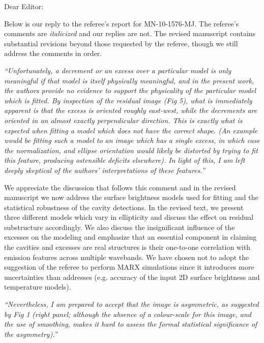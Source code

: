 \documentclass[11pt]{article}
\begin{document}
Dear Editor:

Below is our reply to the referee's report for MN-10-1576-MJ. The
referee's comments are {\it{italicized}} and our replies are not. The
revised manuscript contains substantial revisions beyond those
requested by the referee, though we still address the comments in
order.

\hrulefill

{\it{``Unfortunately, a decrement or an excess over a particular model
    is only meaningful if that model is itself physically meaningful,
    and in the present work, the authors provide no evidence to
    support the physicality of the particular model which is fitted.
    By inspection of the residual image (Fig 5), what is immediately
    apparent is that the excess is oriented roughly east-west, while
    the decrements are oriented in an almost exactly perpendicular
    direction. This is exactly what is expected when fitting a model
    which does not have the correct shape. (An example would be
    fitting such a model to an image which has a single excess, in
    which case the normalization, and ellipse orientation would likely
    be distorted by trying to fit this feature, producing ostensible
    deficits elsewhere). In light of this, I am left deeply skeptical
    of the authors' interpretations of these features.''}}

We appreciate the discussion that follows this comment and in the
revised manuscript we now address the surface brightness models used
for fitting and the statistical robustness of the cavity
detections. In the revised text, we present three different models
which vary in ellipticity and discuss the effect on residual
substructure accordingly. We also discuss the insignificant influence
of the excesses on the modeling and emphasize that an essential
component in claiming the cavities and excesses are real structures is
their one-to-one correlation with emission features across multiple
wavebands. We have chosen not to adopt the suggestion of the referee
to perform MARX simulations since it introduces more uncertainties
than addresses (e.g. accuracy of the input 2D surface brightness and
temperature models).

\hrulefill

{\it{``Nevertheless, I am prepared to accept that the image is
    asymmetric, as suggested by Fig 1 (right panel; although the
    absence of a colour-scale for this image, and the use of
    smoothing, makes it hard to assess the formal statistical
    significance of the asymmetry).''}}
\end{document}
